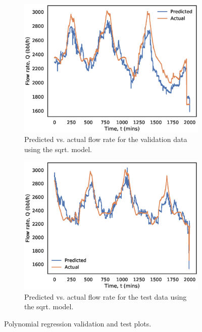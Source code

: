\begin{figure}[h]
     \begin{subfigure}[b]{0.45\textwidth}
         \centering
         \includegraphics[width=\textwidth]{images/08sqrt_validation.eps}
         \caption{Predicted vs. actual flow rate for the validation data using the sqrt. model.}
         \label{fig:08sqrt_validation}
     \end{subfigure}
     \begin{subfigure}[b]{0.45\textwidth}
         \centering
         \includegraphics[width=\textwidth]{images/08sqrt_test.eps}
         \caption{Predicted vs. actual flow rate for the test data using the sqrt. model.}
         \label{fig:08sqrt_test}
     \end{subfigure}
        \caption{Polynomial regression validation and test plots.}
        \label{fig:08PolynomialPlots}
\end{figure}

